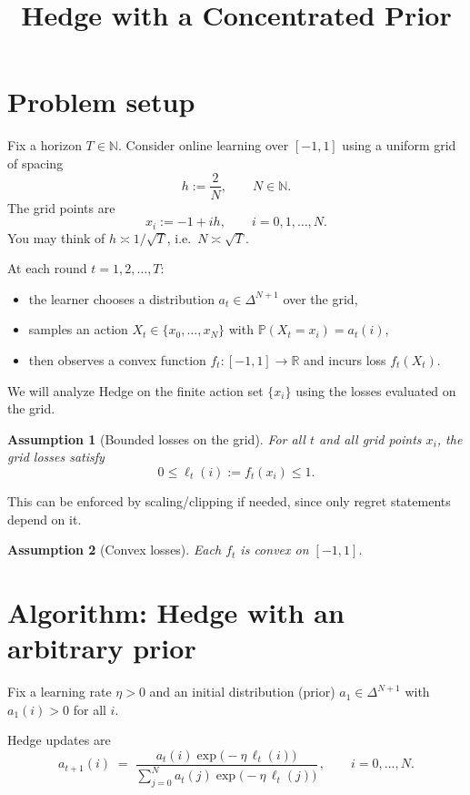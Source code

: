 \documentclass[11pt]{article}
\title{Hedge with a Concentrated Prior}
\date{}
\author{}
\newtheorem{assumption}{Assumption}
\begin{document}
\maketitle

\section{Problem setup}

Fix a horizon $T\in\mathbb{N}$. Consider online learning over $[-1,1]$ using a uniform grid of spacing
\[
    h := \frac{2}{N}, \qquad N\in\mathbb{N}.
\]
The grid points are
\[
    x_i := -1 + i h,\qquad i=0,1,\dots,N.
\]
You may think of $h \asymp 1/\sqrt{T}$, i.e.\ $N\asymp \sqrt{T}$.

At each round $t=1,2,\dots,T$:
\begin{itemize}
    \item the learner chooses a distribution $a_t \in \Delta^{N+1}$ over the grid,
    \item samples an action $X_t\in\{x_0,\dots,x_N\}$ with $\mathbb{P}(X_t=x_i)=a_t(i)$,
    \item then observes a convex function $f_t:[-1,1]\to \mathbb{R}$ and incurs loss $f_t(X_t)$.
\end{itemize}

We will analyze Hedge on the finite action set $\{x_i\}$ using the losses evaluated on the grid.

\begin{assumption}[Bounded losses on the grid]\label{ass:bounded}
    For all $t$ and all grid points $x_i$, the grid losses satisfy
    \[
        0 \le \ell_t(i) := f_t(x_i) \le 1.
    \]
\end{assumption}
This can be enforced by scaling/clipping if needed, since only regret statements depend on it.

\begin{assumption}[Convex losses]\label{ass:convex}
    Each $f_t$ is convex on $[-1,1]$.
\end{assumption}

\section{Algorithm: Hedge with an arbitrary prior}

Fix a learning rate $\eta>0$ and an initial distribution (prior) $a_1\in\Delta^{N+1}$ with $a_1(i)>0$ for all $i$.

Hedge updates are
\begin{equation}\label{eq:hedge}
    a_{t+1}(i) \;=\; \frac{a_t(i)\exp\!\big(-\eta\,\ell_t(i)\big)}{\sum_{j=0}^N a_t(j)\exp\!\big(-\eta\,\ell_t(j)\big)}\,,\qquad i=0,\dots,N.
\end{equation}
\end{document}
